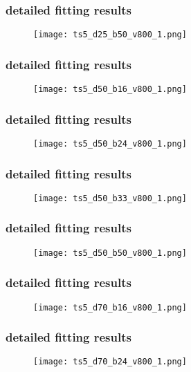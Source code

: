 	\begin{frame}
		\frametitle{\appendixname{} \textendash{} detailed fitting results}
		\begin{figure}
			\texttt{[image: ts5\_d25\_b50\_v800\_1.png]}
		\end{figure}
	\end{frame}

	\begin{frame}
		\frametitle{\appendixname{} \textendash{} detailed fitting results}
		\begin{figure}
			\texttt{[image: ts5\_d50\_b16\_v800\_1.png]}
		\end{figure}
	\end{frame}

	\begin{frame}
		\frametitle{\appendixname{} \textendash{} detailed fitting results}
		\begin{figure}
			\texttt{[image: ts5\_d50\_b24\_v800\_1.png]}
		\end{figure}
	\end{frame}

	\begin{frame}
		\frametitle{\appendixname{} \textendash{} detailed fitting results}
		\begin{figure}
			\texttt{[image: ts5\_d50\_b33\_v800\_1.png]}
		\end{figure}
	\end{frame}

	\begin{frame}
		\frametitle{\appendixname{} \textendash{} detailed fitting results}
		\begin{figure}
			\texttt{[image: ts5\_d50\_b50\_v800\_1.png]}
		\end{figure}
	\end{frame}

	\begin{frame}
		\frametitle{\appendixname{} \textendash{} detailed fitting results}
		\begin{figure}
			\texttt{[image: ts5\_d70\_b16\_v800\_1.png]}
		\end{figure}
	\end{frame}

	\begin{frame}
		\frametitle{\appendixname{} \textendash{} detailed fitting results}
		\begin{figure}
			\texttt{[image: ts5\_d70\_b24\_v800\_1.png]}
		\end{figure}
	\end{frame}

